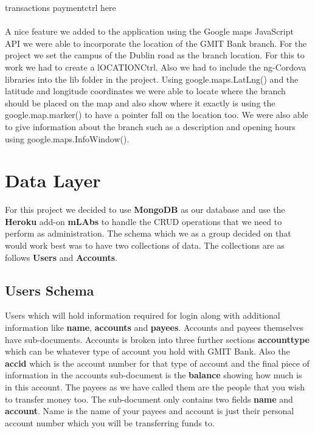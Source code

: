 transactions paymentctrl here\paragraph{}

A nice feature we added to the application using the Google maps JavaScript API we were able to incorporate the location of the GMIT Bank branch. For the project we set the campus of the Dublin road as the branch location. For this to work we had to create a lOCATIONCtrl. Also we had to include the ng-Cordova libraries into the lib folder in the project. Using google.maps.LatLng() and the latitude and longitude coordinates we were able to locate where the branch should be placed on the map and also show where it exactly is using the google.map.marker() to have a pointer fall on the location too. We were also able to give information about the branch such as a description and opening hours using google.maps.InfoWindow().\cite{map}

\section{Data Layer}
For this project we decided to use \textbf{MongoDB} as our database and use the \textbf{Heroku} add-on \textbf{mLAbs} to handle the CRUD operations that we need to perform as administration. The schema which we as a group decided on that would work best was to have two collections of data. The collections are as follows \textbf{Users} and \textbf{Accounts}.\paragraph{}

\subsection{Users Schema}
 Users which will hold information required for login along with additional information like \textbf{name}, \textbf{accounts} and \textbf{payees}. Accounts and payees themselves have sub-documents. Accounts is broken into three further sections \textbf{accounttype} which can be whatever type of account you hold with GMIT Bank. Also the \textbf{accid} which is the account number for that type of account and the final piece of information in the accounts sub-document is the \textbf{balance} showing how much is in this account. The payees as we have called them are the people that you wish to transfer money too. The sub-document only contains two fields \textbf{name} and \textbf{account}. Name is the name of your payees and account is just their personal account number which you will be transferring funds to. \paragraph{}


